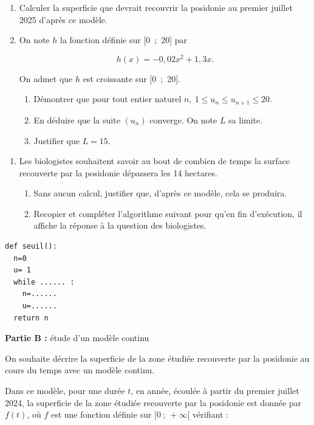 \documentclass[10pt]{article}
\begin{document}
\begin{enumerate}
\item Calculer la superficie que devrait recouvrir la posidonie au premier juillet 2025 d'après ce modèle.
\item On note $h$ la fonction définie sur [0~;~20] par 

\[h(x) = - 0,02x^2 + 1,3x.\]

On admet que $h$ est croissante sur [0~;~20].
	\begin{enumerate}
		\item Démontrer que pour tout entier naturel $n,\: 1 \leqslant u_n  \leqslant u_{n+1} \leqslant 20$.
		\item En déduire que la suite $\left(u_n\right)$ converge. On note $L$ sa limite.
		\item Justifier que $L = 15$.
	\end{enumerate}
\end{enumerate}
\begin{minipage}{0.65\linewidth}
\begin{enumerate}[resume]
\item Les biologistes souhaitent savoir au bout de combien de temps la surface recouverte par la
posidonie dépassera les 14 hectares.
	\begin{enumerate}
		\item Sans aucun calcul, justifier que, d'après ce modèle, cela se produira.
		\item Recopier et compléter l'algorithme suivant pour qu'en fin d'exécution, il affiche la réponse à la question des biologistes.
	\end{enumerate}
\end{enumerate}
\end{minipage}\hfill
\begin{minipage}{0.3\linewidth}
\begin{Verbatim}[frame=single]
def seuil():
  n=0
  u= 1
  while ...... :
    n=......
    u=......
  return n
\end{Verbatim}
\end{minipage}

\begin{center} \textbf{Partie B :} étude d'un modèle continu\end{center}

On souhaite décrire la superficie de la zone étudiée recouverte par la posidonie au cours du temps avec un modèle continu.

Dans ce modèle, pour une durée $t$, en année, écoulée à partir du premier juillet 2024, la superficie de la zone étudiée recouverte par la posidonie est donnée par
$f(t)$, où $f$ est une fonction définie sur $[0~;~ +\infty[$ vérifiant :
\end{document}
